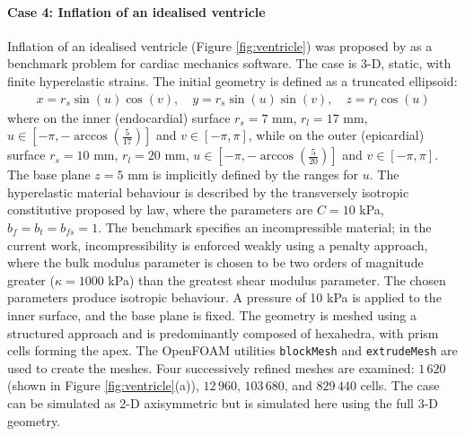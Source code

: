 \documentclass[sn-mathphys,Numbered]{sn-jnl}%
\begin{document}
\paragraph{Case 4: Inflation of an idealised ventricle}
Inflation of an idealised ventricle (Figure \ref{fig:ventricle}) was proposed by \citet{Land2015} as a benchmark problem for cardiac mechanics software.
The case is 3-D, static, with finite hyperelastic strains.
The initial geometry is defined as a truncated ellipsoid:
\begin{eqnarray}
	x = r_s \sin(u) \cos(v), \quad
	y = r_s \sin(u) \sin(v), \quad
	z = r_l \cos(u)
\end{eqnarray}
where on the inner (endocardial) surface $r_s =7$ mm, $r_l = 17$ mm, $u \in \left[-\pi, -\arccos \left( \frac{5}{17} \right) \right]$ and $v \in \left[-\pi, \pi \right]$, while on the outer (epicardial) surface $r_s =10$ mm, $r_l = 20$ mm, $u \in \left[-\pi, -\arccos \left( \frac{5}{20} \right) \right]$ and $v \in \left[-\pi, \pi \right]$.
The base plane $z = 5$ mm is implicitly defined by the ranges for $u$.
The hyperelastic material behaviour is described by the transversely isotropic constitutive proposed by \citet{Guccione1995} law, where the parameters are $C = 10$ kPa, $b_f = b_t = b_{fs} = 1$.
The benchmark specifies an incompressible material; in the current work, incompressibility is enforced weakly using a penalty approach, where the bulk modulus parameter is chosen to be two orders of magnitude greater ($\kappa = 1000$ kPa) than the greatest shear modulus parameter.
The chosen parameters produce isotropic behaviour.
A pressure of 10 kPa is applied to the inner surface, and the base plane is fixed.
The geometry is meshed using a structured approach and is predominantly composed of hexahedra, with prism cells forming the apex.
The OpenFOAM utilities \texttt{blockMesh} and \texttt{extrudeMesh} are used to create the meshes.
Four successively refined meshes are examined: $1\,620$ (shown in Figure \ref{fig:ventricle}(a)), $12\,960$, $103\,680$, and $829\,440$ cells.
The case can be simulated as 2-D axisymmetric but is simulated here using the full 3-D geometry.
\end{document}
